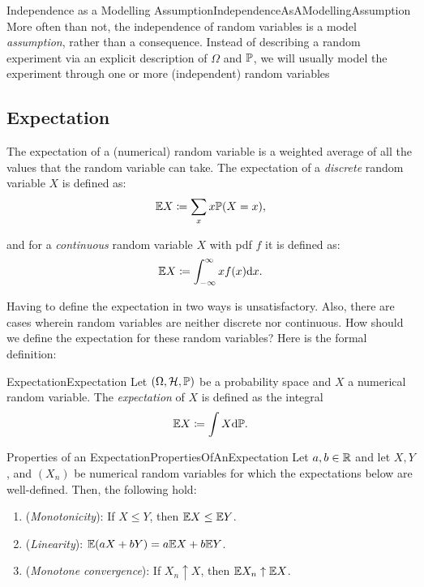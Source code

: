 \begin{xattention}{Independence as a Modelling Assumption}{IndependenceAsAModellingAssumption}
	More often than not, the independence of random variables is a model \textit{assumption}, rather than a consequence. Instead of describing a random experiment via an explicit description of \(\Omega\) and \(\mathbb{P}\), we will usually model the experiment through one or more (independent) random variables
\end{xattention}

\subsection{Expectation}
The expectation of a (numerical) random variable is a weighted average of all the values that the random variable can take. The expectation of a \textit{discrete} random variable \(X\) is defined as:
\begin{equation*}
	\mathbb{E} X \coloneqq \sum_x x \mathbb{P}(X = x),
\end{equation*}

and for a \textit{continuous} random variable \(X\) with pdf \(f\) it is defined as:
\begin{equation*}
	\mathbb{E} X \coloneqq \int_{-\infty}^{\infty} x f(x) \mathrm{d} x.
\end{equation*}

Having to define the expectation in two ways is unsatisfactory. Also, there are cases wherein random variables are neither discrete nor continuous. How should we define the expectation for these random variables? Here is the formal definition:


\begin{defn}{Expectation}{Expectation}
	Let \((\Omega, \mathcal{H}, \mathbb{P})\) be a probability space and \(X\) a numerical random variable. The \textit{expectation} of \(X\) is defined as the integral
	\begin{equation*}
		\mathbb{E} X \coloneqq \int X \mathrm{d} \mathbb{P}.
	\end{equation*}
\end{defn}

\begin{thm}{Properties of an Expectation}{PropertiesOfAnExpectation}
	Let \(a, b \in \mathbb{R}\) and let \(X, Y\), and \((X_n)\) be numerical random variables for which the expectations below are well-defined. Then, the following hold:
	\begin{enumerate}
		\item (\textit{Monotonicity}): If \(X \le Y\), then \(\mathbb{E} X \le \mathbb{E} Y\).
		\item (\textit{Linearity}): \(\mathbb{E}(aX + bY) = a \mathbb{E} X + b \mathbb{E} Y\).
		\item (\textit{Monotone convergence}): If \(X_n \uparrow X\), then \(\mathbb{E} X_n \uparrow \mathbb{E} X\).
	\end{enumerate}
\end{thm}

